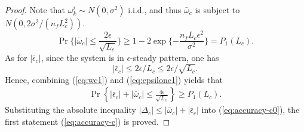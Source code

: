\documentclass[12pt,journal,draftclsnofoot,onecolumn]{IEEEtran}
\begin{document}
\begin{proof}
Note that $\omega_k^i\sim N(0,\sigma^2)$ i.i.d., and thus $\bar{\omega}_c$ is subject to $N(0,2 \sigma^2/({n_f} {L_c^2}))$. 
{}
\begin{equation}\label{eq:wc1}
\Pr\{ |\bar{\omega}_c| \le \frac{2 \epsilon}{\sqrt{L_c}} \} \ge 1 - 2 \exp\{-\frac{{n_f} {L_c}\epsilon^{2}}{ \sigma^{2} }\}=P_1(L_c).
\end{equation}
As for $|\bar{\epsilon}_c| $, since the system is in $\epsilon$-steady pattern, one has 
\begin{equation}\label{eq:epsilonc1}
|\bar{\epsilon}_c|\le 2 \epsilon/L_c \le 2 \epsilon/\sqrt{L_c}. 
\end{equation}
Hence, combining (\ref{eq:wc1}) and (\ref{eq:epsilonc1}) yields that 
\begin{align}\label{eq:accuracy-c0}
\Pr\left \{ |\bar{\epsilon}_c|+|\bar{\omega}_c| \le \frac{4\epsilon}{\sqrt{L_c}} \right\} \!\ge\! P_1(L_c).  
\end{align}
Substituting the absolute inequality $|\Delta_c| \le |\bar{\omega}_c| + |\bar{\epsilon}_c|$ into (\ref{eq:accuracy-c0}), the first statement (\ref{eq:accuracy-c}) is proved. 


\end{proof}
\end{document}
